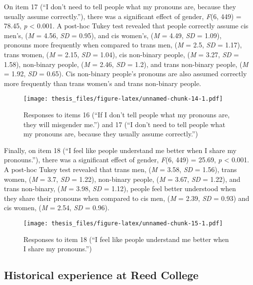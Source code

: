 \documentclass[12pt,twoside]{reedthesis}
\begin{document}
On item 17 (``I don't need to tell people what my pronouns are, because they usually assume correctly.''), there was a significant effect of gender, \emph{F}(6, 449) = 78.45, \emph{p} \textless{} 0.001. A post-hoc Tukey test revealed that people correctly assume cis men's, (\emph{M} = 4.56, \emph{SD} = 0.95), and cis women's, (\emph{M} = 4.49, \emph{SD} = 1.09), pronouns more frequently when compared to trans men, (\emph{M} = 2.5, \emph{SD} = 1.17), trans women, (\emph{M} = 2.15, \emph{SD} = 1.04), cis non-binary people, (\emph{M} = 3.27, \emph{SD} = 1.58), non-binary people, (\emph{M} = 2.46, \emph{SD} = 1.2), and trans non-binary people, (\emph{M} = 1.92, \emph{SD} = 0.65). Cis non-binary people's pronouns are also assumed correctly more frequently than trans women's and trans non-binary people.
\begin{figure}
\centering
\texttt{[image: thesis\_files/figure-latex/unnamed-chunk-14-1.pdf]}
\caption{\label{fig:unnamed-chunk-14}Responses to items 16 (``If I don't tell people what my pronouns are, they will misgender me.'') and 17 (``I don't need to tell people what my pronouns are, because they usually assume correctly.'')}
\end{figure}
Finally, on item 18 (``I feel like people understand me better when I share my pronouns.''), there was a significant effect of gender, \emph{F}(6, 449) = 25.69, \emph{p} \textless{} 0.001. A post-hoc Tukey test revealed that trans men, (\emph{M} = 3.58, \emph{SD} = 1.56), trans women, (\emph{M} = 3.7, \emph{SD} = 1.22), non-binary people, (\emph{M} = 3.67, \emph{SD} = 1.22), and trans non-binary, (\emph{M} = 3.98, \emph{SD} = 1.12), people feel better understood when they share their pronouns when compared to cis men, (\emph{M} = 2.39, \emph{SD} = 0.93) and cis women, (\emph{M} = 2.54, \emph{SD} = 0.96).
\begin{figure}
\centering
\texttt{[image: thesis\_files/figure-latex/unnamed-chunk-15-1.pdf]}
\caption{\label{fig:unnamed-chunk-15}Responses to item 18 (``I feel like people understand me better when I share my pronouns.'')}
\end{figure}
\hypertarget{historical-experience-at-reed-college}{%
\subsection{Historical experience at Reed College}\label{historical-experience-at-reed-college}}
\end{document}
